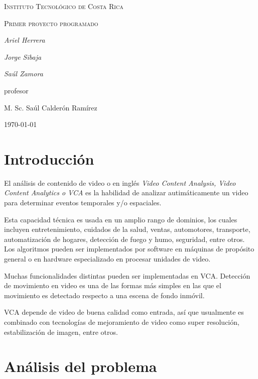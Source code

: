 \documentclass{IEEEtran}
\begin{document}
\begin{titlepage}
  \centering
  {\scshape\LARGE Instituto Tecnol\'ogico de Costa Rica \par}
  \vspace{1cm}
  {\scshape\Large Primer proyecto programado\par}
  \vspace{1.5cm}
  {\Large\itshape Ariel Herrera\par}
  {\Large\itshape Jorge Sibaja\par}
  {\Large\itshape Sa\'ul Zamora\par}
  \vfill
  profesor\par
  M. Sc. Sa\'ul Calder\'on Ram\'irez \textsc{}

  \vfill

  {\large \today\par}
\end{titlepage}

\section{Introducci\'on}

El an\'alisis de contenido de video o en ingl\'es \emph{Video Content Analysis, Video Content Analytics o VCA} es la habilidad de analizar autim\'aticamente un video para determinar eventos temporales y/o espaciales.

Esta capacidad t\'ecnica es usada en un amplio rango de dominios, los cuales incluyen entretenimiento, cuidados de la salud, ventas, automotores, transporte, automatizaci\'on de hogares, detecci\'on de fuego y humo, seguridad, entre otros. Los algoritmos pueden ser implementados por software en m\'aquinas de prop\'osito general o en hardware especializado en procesar unidades de video.

Muchas funcionalidades distintas pueden ser implementadas en VCA. Detecci\'on de movimiento en video es una de las formas m\'as simples en las que el movimiento es detectado respecto a una escena de fondo inm\'ovil.

VCA depende de video de buena calidad como entrada, as\'i que usualmente es combinado con tecnolog\'ias de mejoramiento de video como super resoluci\'on, estabilizaci\'on de imagen, entre otros.

\section{An\'alisis del problema}
\end{document}
